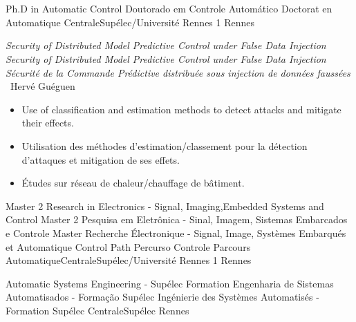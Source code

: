\section{\education}

\cventry{\nov\ 2019 \newline\dec\ 2022\newline}
{
  \ml%
  {Ph.D in Automatic Control}
  {Doutorado em Controle Automático}
  {Doctorat en Automatique}%
}
{\newline CentraleSupélec/Université Rennes 1%
}
{Rennes}{\france}
{
  \ml%
  {
    \emph{Security of Distributed Model Predictive Control under False Data Injection}
  }%
  {
    \emph{Security of Distributed Model Predictive Control under False Data Injection}
  }%
  {\emph{Sécurité de la Commande Prédictive distribuée sous injection de données faussées}}%
  \\
  \supervisor\ Hervé Guéguen
  \ml
  {\begin{itemize}
    \item Use of classification and estimation methods to detect attacks and mitigate their effects.
  \end{itemize}}
  {}
  {\begin{itemize}
     \item Utilisation des méthodes d'estimation/classement pour la détection d'attaques et mitigation de ses effets.
     \item Études sur réseau de chaleur/chauffage de bâtiment.
  \end{itemize}
  }
}

\cventry{\sep\ 2017 \newline \sep\ 2018\newline}
{
  \ml%
  {Master 2 Research in Electronics - Signal, Imaging,Embedded Systems and Control}
  {Master 2 Pesquisa em Eletrônica - Sinal, Imagem,
    Sistemas Embarcados e Controle}
  {Master Recherche Électronique - Signal, Image, Systèmes Embarqués et Automatique}%
}
{\ml%
  {Control Path}
  {Percurso Controle}
  {Parcours Automatique}\newline CentraleSupélec/Université Rennes 1%
}
{Rennes}{\france}{}

\cventry{\sep\ 2016\newline \sep\ 2018\newline}
{
  \ml%
  {Automatic Systems Engineering - Supélec Formation}
  {Engenharia de Sistemas Automatisados - Formação Supélec}
  {Ingénierie des Systèmes Automatisés - Formation Supélec}}
{\newline CentraleSupélec}
{Rennes}{\france}{}

